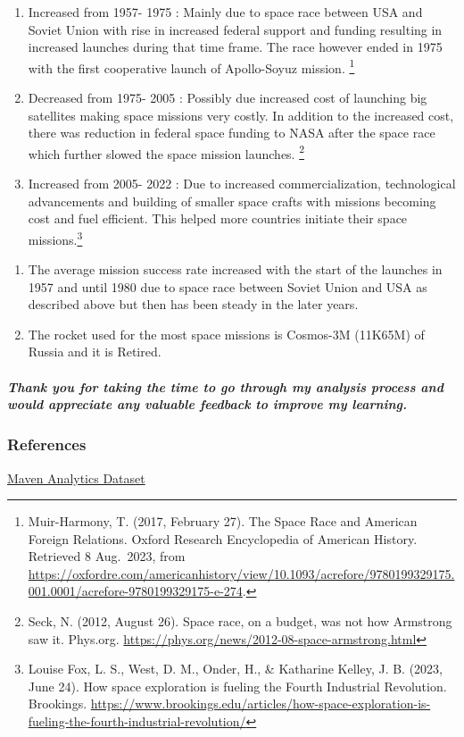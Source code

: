 \documentclass[
]{article}
\begin{document}
\begin{enumerate}
\def\labelenumi{\alph{enumi}.}
\item
  Increased from 1957- 1975 : Mainly due to space race between USA and
  Soviet Union with rise in increased federal support and funding
  resulting in increased launches during that time frame. The race
  however ended in 1975 with the first cooperative launch of
  Apollo-Soyuz mission. \footnote{Muir-Harmony, T. (2017, February 27).
    The Space Race and American Foreign Relations. Oxford Research
    Encyclopedia of American History. Retrieved 8 Aug.~2023, from
    \url{https://oxfordre.com/americanhistory/view/10.1093/acrefore/9780199329175.001.0001/acrefore-9780199329175-e-274}.}
\item
  Decreased from 1975- 2005 : Possibly due increased cost of launching
  big satellites making space missions very costly. In addition to the
  increased cost, there was reduction in federal space funding to NASA
  after the space race which further slowed the space mission launches.
  \footnote{Seck, N. (2012, August 26). Space race, on a budget, was not
    how Armstrong saw it. Phys.org.
    \url{https://phys.org/news/2012-08-space-armstrong.html}}
\item
  Increased from 2005- 2022 : Due to increased commercialization,
  technological advancements and building of smaller space crafts with
  missions becoming cost and fuel efficient. This helped more countries
  initiate their space missions.\footnote{Louise Fox, L. S., West, D.
    M., Onder, H., \& Katharine Kelley, J. B. (2023, June 24). How space
    exploration is fueling the Fourth Industrial Revolution. Brookings.
    \url{https://www.brookings.edu/articles/how-space-exploration-is-fueling-the-fourth-industrial-revolution/}}
\end{enumerate}

\begin{enumerate}
\def\labelenumi{\arabic{enumi}.}
\setcounter{enumi}{4}
\item
  The average mission success rate increased with the start of the
  launches in 1957 and until 1980 due to space race between Soviet Union
  and USA as described above but then has been steady in the later
  years.
\item
  The rocket used for the most space missions is Cosmos-3M (11K65M) of
  Russia and it is Retired.
\end{enumerate}

\hypertarget{thank-you-for-taking-the-time-to-go-through-my-analysis-process-and-would-appreciate-any-valuable-feedback-to-improve-my-learning.}{%
\subparagraph{\texorpdfstring{\textbf{Thank you for taking the time to
go through my analysis process and would appreciate any valuable
feedback to improve my
learning.}}{Thank you for taking the time to go through my analysis process and would appreciate any valuable feedback to improve my learning.}}\label{thank-you-for-taking-the-time-to-go-through-my-analysis-process-and-would-appreciate-any-valuable-feedback-to-improve-my-learning.}}

\hypertarget{references}{%
\subsubsection{References}\label{references}}

\href{https://mavenanalytics.io/data-playground?page=2\&pageSize=5}{Maven
Analytics Dataset}
\end{document}

